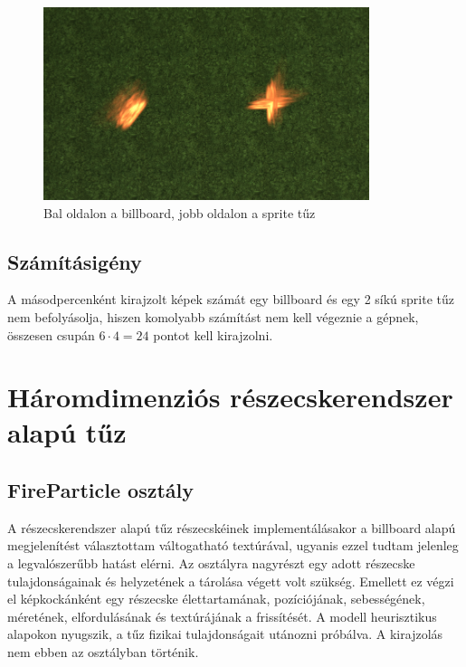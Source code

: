 \begin{figure}[h!]
 \centering
 \includegraphics[width=0.85\textwidth]{kepek/billboardFinal5.png}
 \caption{Bal oldalon a billboard, jobb oldalon a sprite tűz}
 \label{fig:billboardFinal5}
\end{figure}

\subsection{Számításigény}
A másodpercenként kirajzolt képek számát egy billboard és egy 2 síkú sprite tűz nem befolyásolja, hiszen komolyabb számítást nem kell végeznie a gépnek, összesen csupán $6 \cdot 4 = 24$ pontot kell kirajzolni.


\section{Háromdimenziós részecskerendszer alapú tűz}

\subsection{FireParticle osztály}

A részecskerendszer alapú tűz részecskéinek implementálásakor a billboard alapú megjelenítést választottam váltogatható textúrával, ugyanis ezzel tudtam jelenleg a legvalószerűbb hatást elérni. Az osztályra nagyrészt egy adott részecske tulajdonságainak és helyzetének a tárolása végett volt szükség. Emellett ez végzi el képkockánként egy részecske élettartamának, pozíciójának, sebességének, méretének, elfordulásának és textúrájának a frissítését. A modell heurisztikus alapokon nyugszik, a tűz fizikai tulajdonságait utánozni próbálva. A kirajzolás nem ebben az osztályban történik.

